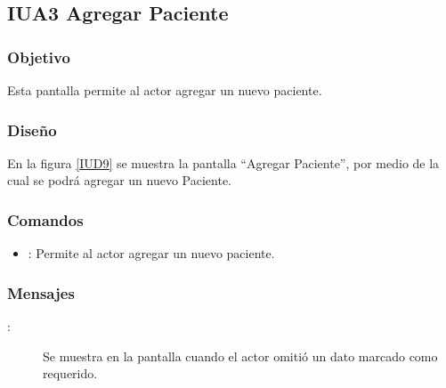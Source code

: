 \subsection{IUA3 Agregar Paciente}
 
\subsubsection{Objetivo}

    Esta pantalla permite al actor agregar un nuevo paciente.

\subsubsection{Diseño}

    En la figura \ref{IUD9} se muestra la pantalla ``Agregar Paciente'', por medio de la cual se podrá agregar un nuevo Paciente. \\


\subsubsection{Comandos}
\begin{itemize}
    \item {}: Permite al actor agregar un nuevo paciente.
    
\end{itemize}

\subsubsection{Mensajes}

\begin{description}
    \item[:] Se muestra en la pantalla  cuando el actor omitió un dato marcado como requerido.
    
\end{description}
